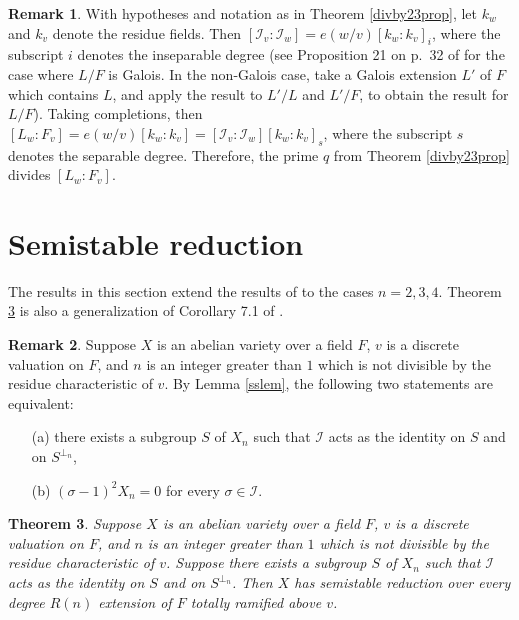 \documentclass{amsart}
\def\I{{\mathcal I}}
\newtheorem{thm}{Theorem}[section]
\theoremstyle{definition}
\newtheorem{rem}[thm]{Remark}
\begin{document}
\begin{rem}
\label{divby23}
With hypotheses and notation as in Theorem \ref{divby23prop},
let $k_{w}$ and $k_{v}$ denote the residue fields.
Then $[\I_{v}:\I_{w}] = e(w/v)[k_{w}:k_{v}]_{i}$, where
the subscript $i$ denotes the inseparable degree (see
Proposition 21 on p.~32 of \cite{Corps} for the case where
$L/F$ is Galois. In the non-Galois case, take a Galois extension
$L'$ of $F$ which contains $L$, and apply the result to
$L'/L$ and $L'/F$, to obtain the result for $L/F$).
Taking completions, then $[L_{w}:F_{v}] = e(w/v)[k_{w}:k_{v}]
= [\I_{v}:\I_{w}][k_{w}:k_{v}]_{s}$, where
the subscript $s$ denotes the separable degree.
Therefore, the prime $q$ from Theorem \ref{divby23prop}
divides $[L_{w}:F_{v}]$.
\end{rem}

\section{Semistable reduction}
\label{ssredsect}

The results in this section extend the results of \cite{dpp}
to the cases $n = 2, 3, 4$. Theorem \ref{oneway} is also
a generalization of Corollary 7.1 of \cite{semistab}.

\begin{rem}
\label{lemrem}
Suppose $X$ is an abelian variety over a field $F$, $v$ is a discrete 
valuation on $F$, and $n$ is an integer greater than $1$ which is not 
divisible by the residue characteristic of $v$. 
By Lemma \ref{sslem}, the following two statements are equivalent:
\begin{enumerate}
\item[(a)] 
there exists a subgroup $S$ of $X_n$
such that $\I$ acts as the identity on $S$ and on $S^{\perp_n}$,
\item[(b)] $(\sigma - 1)^2X_n = 0$ for every $\sigma \in \I$.
\end{enumerate}
\end{rem}

\begin{thm}
\label{oneway}
Suppose $X$ is an abelian variety over a field $F$, $v$ is a discrete 
valuation on $F$, and $n$ is an integer greater than $1$ which is not 
divisible by the residue characteristic of $v$. 
Suppose there exists a subgroup $S$ of $X_n$
such that $\I$ acts as the identity on $S$ and on $S^{\perp_n}$.
Then $X$ has semistable reduction over every degree $R(n)$
extension of $F$ totally ramified above $v$.
\end{thm}
\end{document}
